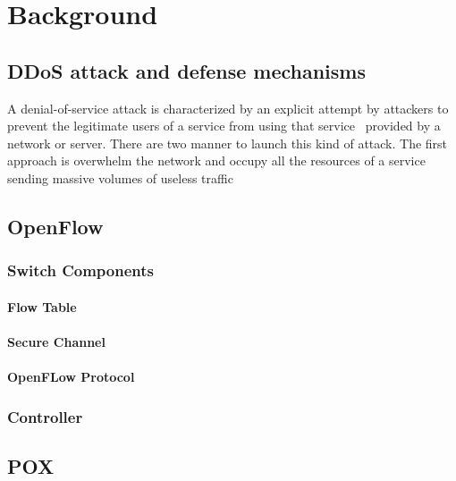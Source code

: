 \chapter{Background}
\label{chapter:background} 



\section{DDoS attack and defense mechanisms}
\label{sec:BGDDoS}

A denial-of-service attack is characterized by an explicit attempt by attackers to prevent the legitimate users of a service from using that service~\cite{dosCert} provided by a network or server. There are two manner to launch this kind of attack. The first approach is overwhelm the network and occupy all the resources of a service sending massive volumes of useless traffic

\section{OpenFlow}
\label{sec:BGOpenFlow}

\subsection{Switch Components}
\label{subsec:PFSwitchComponents}

\subsubsection{Flow Table}
\label{subsec:SCFlowTable} 

\subsubsection{Secure Channel}
\label{subsec:SCSecureChannel}

\subsubsection{OpenFLow Protocol}
\label{subsec:OFProtocolSC}

\subsection{Controller}
\label{subsec:OFController}

\section{POX}
\label{sec:BGPOX}
